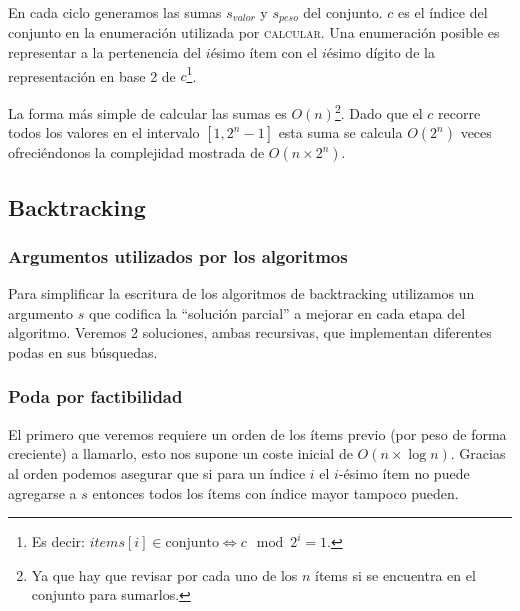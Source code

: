 \documentclass[fleqn, 11pt]{article}
\begin{document}
En cada ciclo generamos las sumas $s_{valor}$ y $s_{peso}$ del conjunto. $c$ es
el índice del conjunto en la enumeración utilizada por \textsc{calcular}. Una
enumeración posible es representar a la pertenencia del $i$ésimo ítem con el
$i$ésimo dígito de la representación en base 2 de $c$\footnote{Es decir:
$items[i] \in \text{conjunto} \iff c \mod 2^i = 1$.}.

La forma más simple de calcular las sumas es $O(n)$\footnote{Ya que hay que
revisar por cada uno de los $n$ ítems si se encuentra en el conjunto para
sumarlos.}.  Dado que el $c$ recorre todos los valores en el intervalo $[1,2^n -
1]$ esta suma se calcula $O(2^n)$ veces ofreciéndonos la complejidad mostrada
de $O(n \times 2^n)$.

\subsection{Backtracking}
\subsubsection{Argumentos utilizados por los algoritmos}

Para simplificar la escritura de los algoritmos de backtracking utilizamos un
argumento $s$ que codifica la ``solución parcial'' a mejorar en cada etapa del
algoritmo. Veremos 2 soluciones, ambas recursivas, que implementan diferentes
podas en sus búsquedas.

\subsubsection{Poda por factibilidad}

El primero que veremos requiere un orden de los ítems previo (por peso de forma
creciente) a llamarlo, esto nos supone un coste inicial de $O(n \times \log
n)$. Gracias al orden podemos asegurar que si para un índice $i$ el $i$-ésimo
ítem no puede agregarse a $s$ entonces todos los ítems con índice mayor tampoco
pueden.
\end{document}
